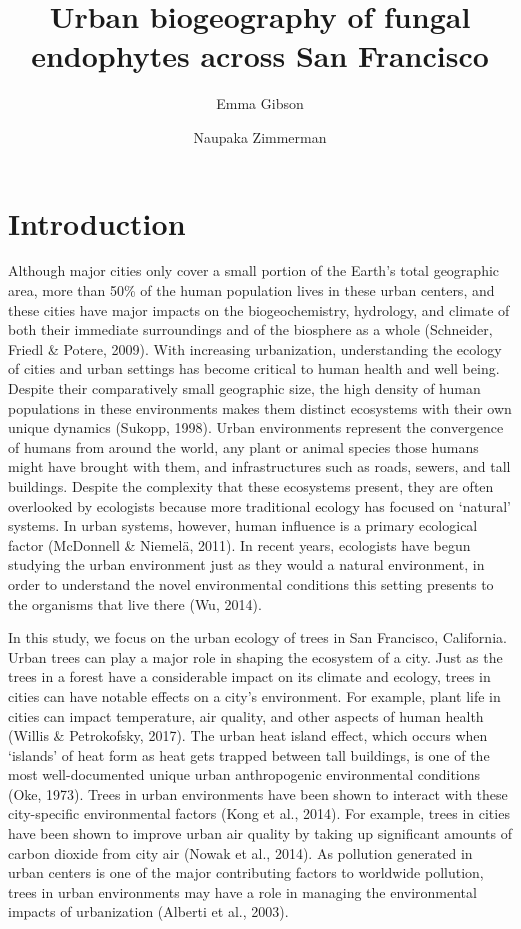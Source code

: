 \documentclass[fleqn,10pt,lineno]{wlpeerj} %
\title{Urban biogeography of fungal endophytes across San Francisco}
\author[1]{Emma Gibson}
\author[1]{Naupaka Zimmerman}
\affil[1]{Department of Biology, University of San Francisco}
\begin{document}
\flushbottom
\maketitle
\thispagestyle{empty}

\hypertarget{introduction}{%
\section*{Introduction}\label{introduction}}

Although major cities only cover a small portion of the Earth's total geographic area, more than 50\% of the human population lives in these urban centers, and these cities have major impacts on the biogeochemistry, hydrology, and climate of both their immediate surroundings and of the biosphere as a whole (Schneider, Friedl \& Potere, 2009). With increasing urbanization, understanding the ecology of cities and urban settings has become critical to human health and well being. Despite their comparatively small geographic size, the high density of human populations in these environments makes them distinct ecosystems with their own unique dynamics (Sukopp, 1998). Urban environments represent the convergence of humans from around the world, any plant or animal species those humans might have brought with them, and infrastructures such as roads, sewers, and tall buildings. Despite the complexity that these ecosystems present, they are often overlooked by ecologists because more traditional ecology has focused on `natural' systems. In urban systems, however, human influence is a primary ecological factor (McDonnell \& Niemelä, 2011). In recent years, ecologists have begun studying the urban environment just as they would a natural environment, in order to understand the novel environmental conditions this setting presents to the organisms that live there (Wu, 2014).

In this study, we focus on the urban ecology of trees in San Francisco, California. Urban trees can play a major role in shaping the ecosystem of a city. Just as the trees in a forest have a considerable impact on its climate and ecology, trees in cities can have notable effects on a city's environment. For example, plant life in cities can impact temperature, air quality, and other aspects of human health (Willis \& Petrokofsky, 2017). The urban heat island effect, which occurs when `islands' of heat form as heat gets trapped between tall buildings, is one of the most well-documented unique urban anthropogenic environmental conditions (Oke, 1973). Trees in urban environments have been shown to interact with these city-specific environmental factors (Kong et al., 2014). For example, trees in cities have been shown to improve urban air quality by taking up significant amounts of carbon dioxide from city air (Nowak et al., 2014). As pollution generated in urban centers is one of the major contributing factors to worldwide pollution, trees in urban environments may have a role in managing the environmental impacts of urbanization (Alberti et al., 2003).
\end{document}

